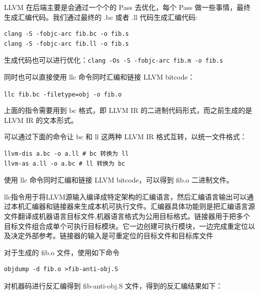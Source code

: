 \documentclass[UTF8,a4paper,10pt]{ctexart}
\begin{document}
LLVM 在后端主要是会通过一个个的 Pass 去优化，每个 Pass 做一些事情，最终生成汇编代码。我们通过最终的 .bc 或者 .ll 代码生成汇编代码:
\begin{verbatim}
clang -S -fobjc-arc fib.bc -o fib.s
clang -S -fobjc-arc fib.ll -o fib.s
\end{verbatim}

生成代码也可以进行优化：\verb|clang -Os -S -fobjc-arc fib.m -o fib.s|

同时也可以直接使用 llc 命令同时汇编和链接 LLVM bitcode：

\verb|llc fib.bc -filetype=obj -o fib.o|

上面的指令需要用到 bc 格式，即 LLVM IR 的二进制代码形式，而之前生成的是 LLVM IR 的文本形式。

可以通过下面的命令让 bc 和 ll 这两种 LLVM IR 格式互转，以统一文件格式：

\begin{verbatim}
llvm-dis a.bc -o a.ll # bc 转换为 ll
llvm-as a.ll -o a.bc # ll 转换为 bc
\end{verbatim}

使用 llc 命令同时汇编和链接 LLVM bitcode，可以得到 fib.o 二进制文件。

llc指令用于将LLVM源输入编译成特定架构的汇编语言，然后汇编语言输出可以通过本机汇编器和链接器来生成本机可执行文件。汇编器具体功能则是把汇编语言源文件翻译成机器语言目标文件,机器语言格式为公用目标格式。链接器用于把多个目标文件组合成单个可执行目标模块。它一边创建可执行模块，一边完成重定位以及决定外部参考。链接器的输入是可重定位的目标文件和目标库文件

对于生成的 fib.o 文件，使用如下命令

\begin{verbatim}
objdump -d fib.o >fib-anti-obj.S
\end{verbatim}

对机器码进行反汇编得到 fib-anti-obj.S 文件，得到的反汇编结果如下：
\end{document}
